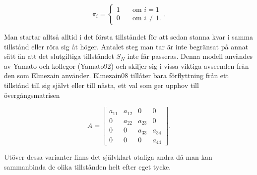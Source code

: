 \documentclass[../rapport_MVEX01-11-05]{subfiles}
\begin{document}
\begin{equation*}
\pi_i = \begin{cases}
         1 & \quad\text{om } i = 1\\
         0 & \quad\text{om } i \neq 1.\end{cases}.
\end{equation*}  

Man startar alltså alltid i det första tillståndet för att sedan
stanna kvar i samma tillstånd eller röra sig åt höger. Antalet steg
man tar är inte begränsat på annat sätt än att det slutgiltiga
tillståndet $S_N$ inte får passeras. Denna modell användes av Yamato
och kollegor (Yamato92) och skiljer sig i vissa viktiga avseenden från
den som Elmezain använder. Elmezain08 tillåter bara förflyttning från
ett tillstånd till sig självt eller till nästa, ett val som ger upphov
till övergångsmatrisen

\begin{equation*}
A = \begin{bmatrix}
a_{11} & a_{12} & 0 & 0\\
0 & a_{22} & a_{23} & 0\\
0 & 0 & a_{33} & a_{34}\\
0 & 0 & 0 & a_{44}
\end{bmatrix}.  
\end{equation*} 

Utöver dessa varianter finns det självklart otaliga andra då man kan
sammanbinda de olika tillstånden helt efter eget tycke.  
\end{document}
